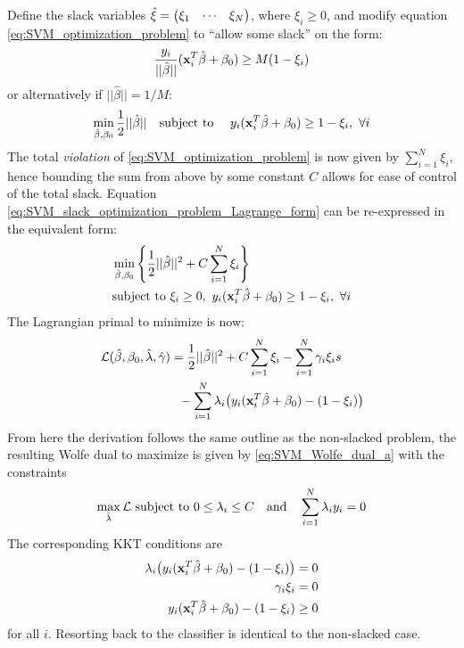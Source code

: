 \documentclass[nofootinbib,reprint,english]{revtex4-1}
\begin{document}
Define the slack variables \(\hat{\xi}=\mqty(\xi_1&\cdots&\xi_N)\), where \(\xi_i\geq0\), and modify equation \eqref{eq:SVM_optimization_problem} to ``allow some slack'' on the form:
\begin{equation}
\frac{y_i}{||\hat{\beta}||}(\vb{x}_i^T\hat{\beta}+\beta_0)\geq M(1-\xi_i)
\end{equation}
or alternatively if \(||\hat{\beta}||=1/M\):
\begin{equation}\label{eq:SVM_slack_optimization_problem_Lagrange_form}
\min_{\hat{\beta},\beta_0}\frac{1}{2}||\hat{\beta}||\qq{subject to }y_i(\vb{x}_i^T\hat{\beta}+\beta_0)\geq1-\xi_i,\ \forall i
\end{equation}
The total \emph{violation} of \eqref{eq:SVM_optimization_problem} is now given by \(\sum_{i=1}^N\xi_i\), hence bounding the sum from above by some constant \(C\) allows for ease of control of the total slack. Equation \eqref{eq:SVM_slack_optimization_problem_Lagrange_form} can be re-expressed in the equivalent form:
\begin{subequations}
\begin{align}
&\min_{\hat{\beta},\beta_0}\left\lbrace\frac{1}{2}||\hat{\beta}||^2+C\sum_{i=1}^N\xi_i\right\rbrace\\
&\text{subject to }\xi_i\geq0,\ y_i(\vb{x}_i^T\hat{\beta}+\beta_0)\geq1-\xi_i,\ \forall i
\end{align}
\end{subequations}
The Lagrangian primal to minimize is now:
\begin{subequations}
\begin{align}
\mathcal{L}(\hat{\beta},\beta_0,\hat{\lambda},\hat{\gamma})&=\frac{1}{2}||\hat{\beta}||^2+C\sum_{i=1}^N\xi_i-\sum_{i=1}^N\gamma_i\xi_is\\
&\ \ -\sum_{i=1}^N\lambda_i\big(y_i(\vb{x}_i^T\hat{\beta}+\beta_0)-(1-\xi_i)\big)
\end{align}
\end{subequations}
From here the derivation follows the same outline as the non-slacked problem, the resulting Wolfe dual to maximize is given by \eqref{eq:SVM_Wolfe_dual_a} with the constraints
\begin{equation}
\max_{\hat{\lambda}}\mathcal{L}\ \text{subject to }0\leq\lambda_i\leq C\qand\sum_{i=1}^N\lambda_iy_i=0
\end{equation}
The corresponding KKT conditions are
\begin{subequations}
\begin{align}
\lambda_i\big(y_i(\vb{x}_i^T\hat{\beta}+\beta_0)-(1-\xi_i)\big)&=0\\
\gamma_i\xi_i&=0\\
y_i(\vb{x}_i^T\hat{\beta}+\beta_0)-(1-\xi_i)&\geq0
\end{align}
\end{subequations}
for all \(i\). Resorting back to the classifier is identical to the non-slacked case.
\end{document}
